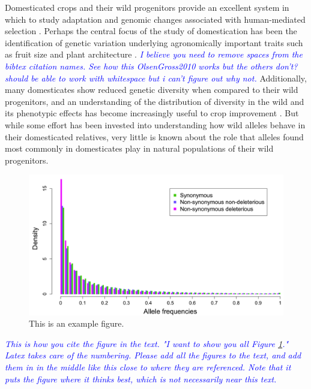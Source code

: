 \documentclass[12pt]{article}
\newcommand{\jri}[1]{\textcolor{blue}{ \emph{\scriptsize  #1}} }
\begin{document}
Domesticated crops and their wild progenitors provide an excellent system in which to study adaptation and genomic changes associated with human-mediated selection \cite{Ross-Ibarra et al 2007}. Perhaps the central focus of the study of domestication has been the identification of genetic variation underlying agronomically important traits such as fruit size and plant architecture \cite{OlsenGross2010}. \jri{I believe you need to remove spaces from the bibtex citation names.  See how this OlsenGross2010 works but the others don't? should be able to work with whitespace but i can't figure out why not.}  Additionally, many domesticates show reduced genetic diversity when compared to their wild progenitors, and an understanding of the distribution of diversity in the wild and its phenotypic effects has become increasingly useful to crop improvement \cite{Kovach and McCouch 2008}. But while some effort has been invested into understanding how wild alleles behave in their domesticated relatives, very little is known about the role that alleles found most commonly in domesticates play in natural populations of their wild progenitors.

\begin{figure}[!t]
  \begin{center}
   \includegraphics[width=150mm]{SFS.png}
    \caption{This is an example figure.} 
\label{sfs_non_syn}
  \end{center}
\end{figure}

\jri{This is how you cite the figure in the text. "I want to show you all Figure \ref{sfs_non_syn}." Latex takes care of the numbering.  Please add all the figures to the text, and add them in in the middle like this close to where they are referenced. Note that it puts the figure where it thinks best, which is not necessarily near this text.}
\end{document}
